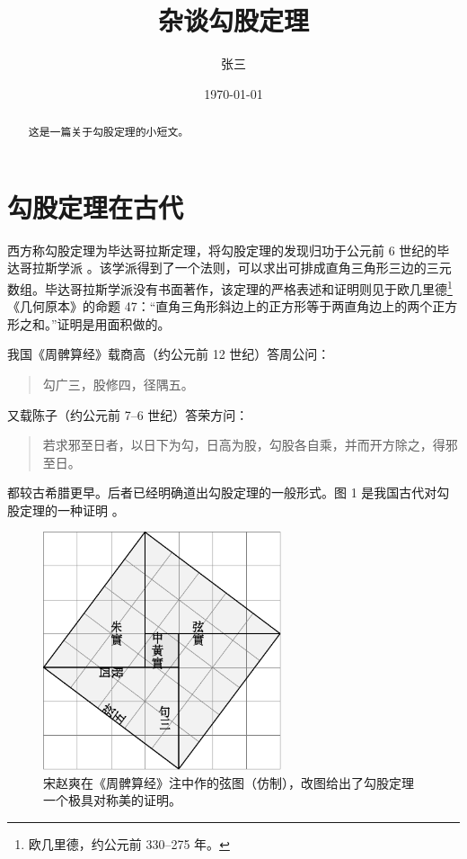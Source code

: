 \documentclass[UTF8]{ctexart}
\title{\heiti 杂谈勾股定理}
\author{\kaishu 张三}
\date{\today}
\newenvironment{myquote}
 {\begin{quote}\kaishu\zihao{-5}}
 {\end{quote}}
\begin{document}
\maketitle
\begin{abstract}
这是一篇关于勾股定理的小短文。
\end{abstract}

\tableofcontents

\section{勾股定理在古代}
\label{sec:ancient}

西方称勾股定理为毕达哥拉斯定理，将勾股定理的发现归功于公元前 6 世纪的毕达哥拉斯学派 \cite{Kline}。该学派得到了一个法则，可以求出可排成直角三角形三边的三元数组。毕达哥拉斯学派没有书面著作，该定理的严格表述和证明则见于欧几里德\footnote{欧几里德，约公元前 330--275 年。}《几何原本》的命题 47：“直角三角形斜边上的正方形等于两直角边上的两个正方形之和。”证明是用面积做的。

我国《周髀算经》载商高（约公元前 12 世纪）答周公问：
\begin{myquote}
勾广三，股修四，径隅五。%
\end{myquote}

又载陈子（约公元前 7--6 世纪）答荣方问：
\begin{quote}
\kaishu 若求邪至日者，以日下为勾，日高为股，勾股各自乘，并而开方除之，得邪至日。
\end{quote}
都较古希腊更早。后者已经明确道出勾股定理的一般形式。图 1 是我国古代对勾股定理的一种证明 \cite{quanjing}。

\begin{figure}[ht]
	\centering
	\includegraphics[width=7cm]{xiantu.pdf}
	\caption{宋赵爽在《周髀算经》注中作的弦图（仿制），改图给出了勾股定理一个极具对称美的证明。}
	\label{fig:xiantu}
\end{figure}
\end{document}
